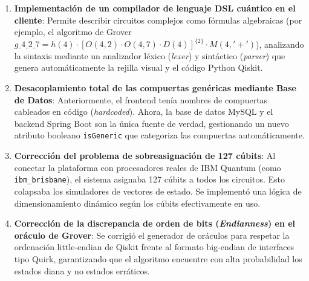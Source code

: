 \documentclass[11pt,a4paper]{article}
\begin{document}
\begin{enumerate}
    \item \textbf{Implementación de un compilador de lenguaje DSL cuántico en el cliente}:
    Permite describir circuitos complejos como fórmulas algebraicas (por ejemplo, el algoritmo de Grover $g\_4\_2\_7 = h(4) \cdot [O(4, 2) \cdot O(4, 7) \cdot D(4)]^{\{2\}} \cdot M(4, '+') $), analizando la sintaxis mediante un analizador léxico (\textit{lexer}) y sintáctico (\textit{parser}) que genera automáticamente la rejilla visual y el código Python Qiskit.
    
    \item \textbf{Desacoplamiento total de las compuertas genéricas mediante Base de Datos}:
    Anteriormente, el frontend tenía nombres de compuertas cableados en código (\textit{hardcoded}). Ahora, la base de datos MySQL y el backend Spring Boot son la única fuente de verdad, gestionando un nuevo atributo booleano \texttt{isGeneric} que categoriza las compuertas automáticamente.
    
    \item \textbf{Corrección del problema de sobreasignación de 127 cúbits}:
    Al conectar la plataforma con procesadores reales de IBM Quantum (como \texttt{ibm\_brisbane}), el sistema asignaba 127 cúbits a todos los circuitos. Esto colapsaba los simuladores de vectores de estado. Se implementó una lógica de dimensionamiento dinámico según los cúbits efectivamente en uso.
    
    \item \textbf{Corrección de la discrepancia de orden de bits (\textit{Endianness}) en el oráculo de Grover}:
    Se corrigió el generador de oráculos para respetar la ordenación little-endian de Qiskit frente al formato big-endian de interfaces tipo Quirk, garantizando que el algoritmo encuentre con alta probabilidad los estados diana y no estados erráticos.
\end{enumerate}
\end{document}
